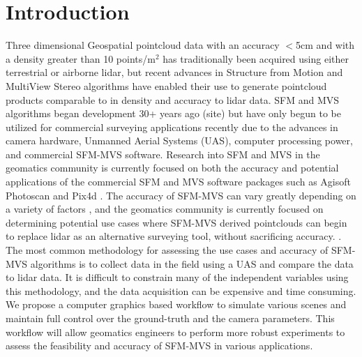 \section{Introduction}

Three dimensional Geospatial pointcloud data with an accuracy $<$5cm and with a density greater than 10 points/m$^2$ has traditionally been acquired using either terrestrial or airborne lidar, but recent advances in Structure from Motion and MultiView Stereo algorithms have enabled their use to generate pointcloud products comparable to in density and accuracy to lidar data.  SFM and MVS algorithms began development 30+ years ago (site) but have only begun to be utilized for commercial surveying applications recently due to the advances in camera hardware, Unmanned Aerial Systems (UAS), computer processing power, and commercial SFM-MVS software.  Research into SFM and MVS in the geomatics community is currently focused on both the accuracy and potential applications of the commercial SFM and MVS software packages such as Agisoft Photoscan and Pix4d .  The accuracy of SFM-MVS can vary greatly depending on a variety of factors , and the geomatics community is currently focused on determining potential use cases where SFM-MVS derived pointclouds can begin to replace lidar as an alternative surveying tool, without sacrificing accuracy.  .  The most common methodology for assessing the use cases and accuracy of SFM-MVS algorithms is to collect data in the field using a UAS and compare the data to lidar data.  It is difficult to constrain many of the independent variables using this methodology, and the data acquisition can be expensive and time consuming.  We propose a computer graphics based workflow to simulate various scenes and maintain full control over the ground-truth and the camera parameters.  This workflow will allow geomatics engineers to perform more robust experiments to assess the feasibility and accuracy of SFM-MVS in various applications.


